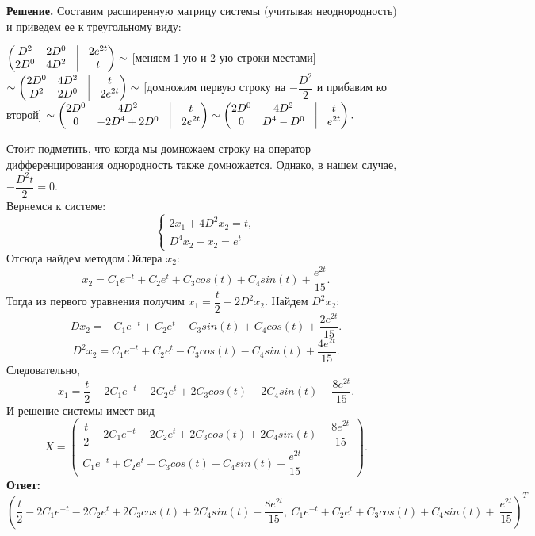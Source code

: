 \documentclass[a4paper, 12pt]{article}
\begin{document}
\textbf{Решение.} Составим расширенную матрицу системы (учитывая неоднородность) и приведем ее к треугольному виду:
\begin{center}
	$\begin{pmatrix}
		D^2 & 2D^0 & \vline & 2e^{2t}\\
		2D^0 & 4D^2 & \vline & t
	\end{pmatrix}\sim$ [меняем 1-ую и 2-ую строки местами] $\sim \begin{pmatrix}
	2D^0 & 4D^2 & \vline & t\\
	D^2 & 2D^0 & \vline & 2e^{2t}
\end{pmatrix} \sim$ [домножим первую строку на $-\dfrac{D^2}{2}$ и прибавим ко второй] $\sim \begin{pmatrix}
2D^0 & 4D^2 & \vline & t\\
0 & -2D^4 + 2D^0 & \vline & 2e^{2t}
\end{pmatrix}\sim\begin{pmatrix}
2D^0 & 4D^2 & \vline & t\\
0 & D^4 - D^0 & \vline & e^{2t}
\end{pmatrix}.$
\end{center}
Стоит подметить, что когда мы домножаем строку на оператор дифференцирования однородность также домножается. Однако, в нашем случае, $-\dfrac{D^2t}{2} = 0$.\\
Вернемся к системе:
$$\begin{cases}
	2x_1 + 4D^2x_2 = t,\\
	D^4x_2 - x_2 = e^t
\end{cases}$$
Отсюда найдем методом Эйлера $x_2$: $$x_2 = C_1e^{-t} + C_2e^t + C_3cos(t) + C_4sin(t) + \dfrac{e^{2t}}{15}.$$
Тогда из первого уравнения получим $x_1 = \dfrac{t}{2}  - 2D^2x_2.$
Найдем $D^2x_2$:
$$Dx_2 = -C_1e^{-t} + C_2e^t - C_3sin(t) + C_4cos(t) + \dfrac{2e^{2t}}{15}.$$
$$D^2x_2 =C_1e^{-t} + C_2e^t - C_3cos(t) - C_4sin(t) + \dfrac{4e^{2t}}{15}.$$
Следовательно, $$x_1 = \dfrac{t}{2} - 2C_1e^{-t} -2 C_2e^t +2C_3cos(t) +2 C_4sin(t) - \dfrac{8e^{2t}}{15}.$$
И решение системы имеет вид
$$X = \begin{pmatrix}
	\dfrac{t}{2} - 2C_1e^{-t} -2 C_2e^t +2C_3cos(t) +2 C_4sin(t) - \dfrac{8e^{2t}}{15}\\
	C_1e^{-t} + C_2e^t + C_3cos(t) + C_4sin(t) + \dfrac{e^{2t}}{15}
\end{pmatrix}.$$
\textbf{Ответ:} $(\dfrac{t}{2} - 2C_1e^{-t} -2 C_2e^t +2C_3cos(t) +2 C_4sin(t) - \dfrac{8e^{2t}}{15},\ 
C_1e^{-t} + C_2e^t + C_3cos(t) + C_4sin(t) + ~\dfrac{e^{2t}}{15})^T$
\end{document}
